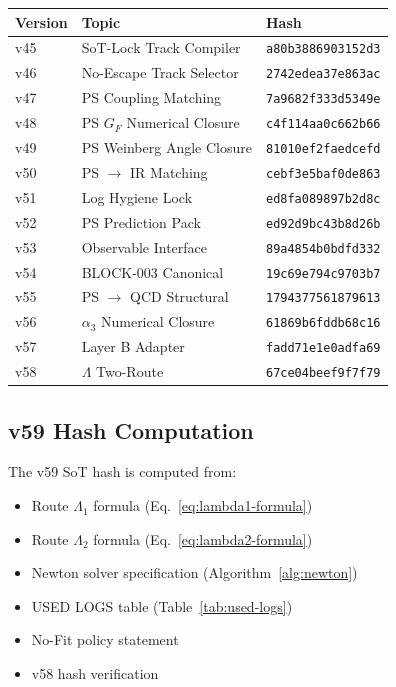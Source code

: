 \documentclass[11pt,a4paper]{article}
\theoremstyle{definition}
\begin{document}
\begin{hashbox}
\begin{tabular}{lll}
\toprule
Version & Topic & Hash \\
\midrule
v45 & SoT-Lock Track Compiler & \texttt{a80b3886903152d3} \\
v46 & No-Escape Track Selector & \texttt{2742edea37e863ac} \\
v47 & PS Coupling Matching & \texttt{7a9682f333d5349e} \\
v48 & PS $G_F$ Numerical Closure & \texttt{c4f114aa0c662b66} \\
v49 & PS Weinberg Angle Closure & \texttt{81010ef2faedcefd} \\
v50 & PS $\to$ IR Matching & \texttt{cebf3e5baf0de863} \\
v51 & Log Hygiene Lock & \texttt{ed8fa089897b2d8c} \\
v52 & PS Prediction Pack & \texttt{ed92d9bc43b8d26b} \\
v53 & Observable Interface & \texttt{89a4854b0bdfd332} \\
v54 & BLOCK-003 Canonical & \texttt{19c69e794c9703b7} \\
v55 & PS $\to$ QCD Structural & \texttt{1794377561879613} \\
v56 & $\alpha_3$ Numerical Closure & \texttt{61869b6fddb68c16} \\
v57 & Layer B Adapter & \texttt{fadd71e1e0adfa69} \\
v58 & $\Lambda$ Two-Route & \texttt{67ce04beef9f7f79} \\
\bottomrule
\end{tabular}
\end{hashbox}

\subsection{v59 Hash Computation}
\label{subsec:v59-hash}

The v59 SoT hash is computed from:
\begin{itemize}
  \item Route $\Lambda_1$ formula (Eq.~\ref{eq:lambda1-formula})
  \item Route $\Lambda_2$ formula (Eq.~\ref{eq:lambda2-formula})
  \item Newton solver specification (Algorithm~\ref{alg:newton})
  \item USED LOGS table (Table~\ref{tab:used-logs})
  \item No-Fit policy statement
  \item v58 hash verification
\end{itemize}
\end{document}
